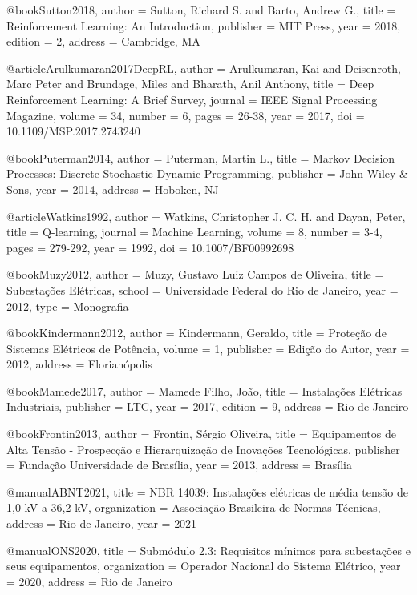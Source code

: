 @book{Sutton2018,
  author = {Sutton, Richard S. and Barto, Andrew G.},
  title = {Reinforcement Learning: An Introduction},
  publisher = {MIT Press},
  year = {2018},
  edition = {2},
  address = {Cambridge, MA}
}

@article{Arulkumaran2017DeepRL,
  author = {Arulkumaran, Kai and Deisenroth, Marc Peter and Brundage, Miles and Bharath, Anil Anthony},
  title = {Deep Reinforcement Learning: A Brief Survey},
  journal = {IEEE Signal Processing Magazine},
  volume = {34},
  number = {6},
  pages = {26-38},
  year = {2017},
  doi = {10.1109/MSP.2017.2743240}
}

@book{Puterman2014,
  author = {Puterman, Martin L.},
  title = {Markov Decision Processes: Discrete Stochastic Dynamic Programming},
  publisher = {John Wiley \& Sons},
  year = {2014},
  address = {Hoboken, NJ}
}

@article{Watkins1992,
  author = {Watkins, Christopher J. C. H. and Dayan, Peter},
  title = {Q-learning},
  journal = {Machine Learning},
  volume = {8},
  number = {3-4},
  pages = {279-292},
  year = {1992},
  doi = {10.1007/BF00992698}
}

@book{Muzy2012,
  author = {Muzy, Gustavo Luiz Campos de Oliveira},
  title = {Subestações Elétricas},
  school = {Universidade Federal do Rio de Janeiro},
  year = {2012},
  type = {Monografia}
}

@book{Kindermann2012,
  author = {Kindermann, Geraldo},
  title = {Proteção de Sistemas Elétricos de Potência},
  volume = {1},
  publisher = {Edição do Autor},
  year = {2012},
  address = {Florianópolis}
}

@book{Mamede2017,
  author = {Mamede Filho, João},
  title = {Instalações Elétricas Industriais},
  publisher = {LTC},
  year = {2017},
  edition = {9},
  address = {Rio de Janeiro}
}

@book{Frontin2013,
  author = {Frontin, Sérgio Oliveira},
  title = {Equipamentos de Alta Tensão - Prospecção e Hierarquização de Inovações Tecnológicas},
  publisher = {Fundação Universidade de Brasília},
  year = {2013},
  address = {Brasília}
}

@manual{ABNT2021,
  title = {NBR 14039: Instalações elétricas de média tensão de 1,0 kV a 36,2 kV},
  organization = {Associação Brasileira de Normas Técnicas},
  address = {Rio de Janeiro},
  year = {2021}
}

@manual{ONS2020,
  title = {Submódulo 2.3: Requisitos mínimos para subestações e seus equipamentos},
  organization = {Operador Nacional do Sistema Elétrico},
  year = {2020},
  address = {Rio de Janeiro}
}

